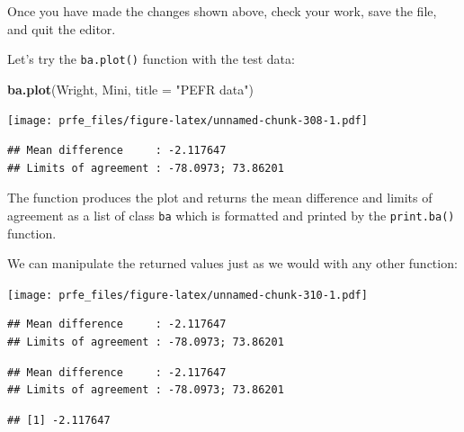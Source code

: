 \documentclass[12pt,a4paper]{book}
\newenvironment{Shaded}{\begin{snugshade}}{\end{snugshade}}
\newcommand{\KeywordTok}[1]{\textcolor[rgb]{0.13,0.29,0.53}{\textbf{#1}}}
\newcommand{\DataTypeTok}[1]{\textcolor[rgb]{0.13,0.29,0.53}{#1}}
\newcommand{\DecValTok}[1]{\textcolor[rgb]{0.00,0.00,0.81}{#1}}
\newcommand{\StringTok}[1]{\textcolor[rgb]{0.31,0.60,0.02}{#1}}
\newcommand{\OperatorTok}[1]{\textcolor[rgb]{0.81,0.36,0.00}{\textbf{#1}}}
\newcommand{\NormalTok}[1]{#1}
\theoremstyle{definition}
\theoremstyle{definition}
\theoremstyle{definition}
\theoremstyle{remark}
\begin{document}
Once you have made the changes shown above, check your work, save the
file, and quit the editor.

Let's try the \texttt{ba.plot()} function with the test data:

\begin{Shaded}
\begin{Highlighting}[]
\KeywordTok{ba.plot}\NormalTok{(Wright, Mini, }\DataTypeTok{title =} \StringTok{"PEFR data"}\NormalTok{)}
\end{Highlighting}
\end{Shaded}

\texttt{[image: prfe\_files/figure-latex/unnamed-chunk-308-1.pdf]}

\begin{verbatim}
## Mean difference     : -2.117647
## Limits of agreement : -78.0973; 73.86201
\end{verbatim}

The function produces the plot and returns the mean difference and
limits of agreement as a list of class \texttt{ba} which is formatted
and printed by the \texttt{print.ba()} function.

We can manipulate the returned values just as we would with any other
function:

\begin{Shaded}
\end{Shaded}

\texttt{[image: prfe\_files/figure-latex/unnamed-chunk-310-1.pdf]}

\begin{verbatim}
## Mean difference     : -2.117647
## Limits of agreement : -78.0973; 73.86201
\end{verbatim}

\begin{verbatim}
## Mean difference     : -2.117647
## Limits of agreement : -78.0973; 73.86201
\end{verbatim}

\begin{verbatim}
## [1] -2.117647
\end{verbatim}
\end{document}
